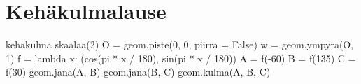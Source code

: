 \section*{Kehäkulmalause}

\begin{luoKuva}{kehakulma}
skaalaa(2)
O = geom.piste(0, 0, piirra = False)
w = geom.ympyra(O, 1)
f = lambda x: (cos(pi * x / 180), sin(pi * x / 180))
A = f(-60)
B = f(135)
C = f(30)
geom.jana(A, B)
geom.jana(B, C)
geom.kulma(A, B, C)
\end{luoKuva}

